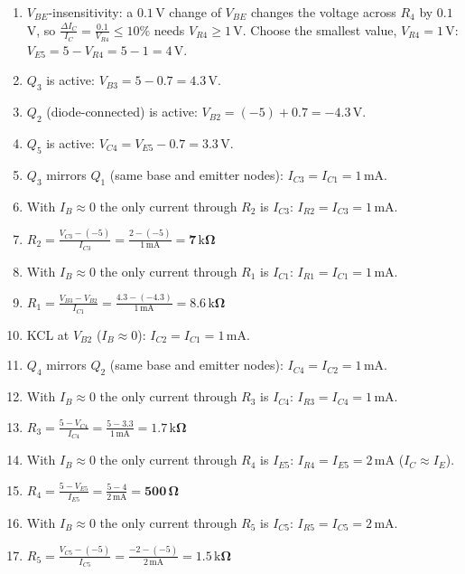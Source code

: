 \documentclass[11pt]{article}
\newcommand{\solstep}[2]{\par\medskip{\color{stepc}\textbf{Step #1 --- #2}}\par\nopagebreak}
\begin{document}
\solstep{2}{Design, node by node}\begin{enumerate}[leftmargin=*,itemsep=3pt]
\item $V_{BE}$-insensitivity: a $0.1$\,V change of $V_{BE}$ changes the voltage across $R_{4}$ by $0.1$\,V, so $\frac{\Delta I_C}{I_C} = \frac{0.1}{V_{R4}} \le 10\%$ needs $V_{R4} \ge 1$\,V. Choose the smallest value, $V_{R4} = 1$\,V: $V_{E5} = 5 - V_{R4} = 5 - 1 = 4\,\mathrm{V}$.
\item $Q_{3}$ is active: $V_{B3} = 5 - 0.7 = 4.3\,\mathrm{V}$.
\item $Q_{2}$ (diode-connected) is active: $V_{B2} = (-5) + 0.7 = -4.3\,\mathrm{V}$.
\item $Q_{5}$ is active: $V_{C4} = V_{E5} - 0.7 = 3.3\,\mathrm{V}$.
\item $Q_{3}$ mirrors $Q_{1}$ (same base and emitter nodes): $I_{C3} = I_{C1} = 1\,\mathrm{m}\mathrm{A}$.
\item With $I_B\approx0$ the only current through $R_{2}$ is $I_{C3}$: $I_{R2} = I_{C3} = 1\,\mathrm{m}\mathrm{A}$.
\item $\displaystyle R_{2} = \frac{V_{C3} - (-5)}{I_{C3}} = \frac{2 - (-5)}{1\,\mathrm{m}\mathrm{A}} = \mathbf{7\,\mathrm{k}\Omega}$
\item With $I_B\approx0$ the only current through $R_{1}$ is $I_{C1}$: $I_{R1} = I_{C1} = 1\,\mathrm{m}\mathrm{A}$.
\item $\displaystyle R_{1} = \frac{V_{B3} - V_{B2}}{I_{C1}} = \frac{4.3 - (-4.3)}{1\,\mathrm{m}\mathrm{A}} = \mathbf{8.6\,\mathrm{k}\Omega}$
\item KCL at $V_{B2}$ ($I_B\approx0$): $I_{C2} = I_{C1} = 1\,\mathrm{m}\mathrm{A}$.
\item $Q_{4}$ mirrors $Q_{2}$ (same base and emitter nodes): $I_{C4} = I_{C2} = 1\,\mathrm{m}\mathrm{A}$.
\item With $I_B\approx0$ the only current through $R_{3}$ is $I_{C4}$: $I_{R3} = I_{C4} = 1\,\mathrm{m}\mathrm{A}$.
\item $\displaystyle R_{3} = \frac{5 - V_{C4}}{I_{C4}} = \frac{5 - 3.3}{1\,\mathrm{m}\mathrm{A}} = \mathbf{1.7\,\mathrm{k}\Omega}$
\item With $I_B\approx0$ the only current through $R_{4}$ is $I_{E5}$: $I_{R4} = I_{E5} = 2\,\mathrm{m}\mathrm{A}$ ($I_C\approx I_E$).
\item $\displaystyle R_{4} = \frac{5 - V_{E5}}{I_{E5}} = \frac{5 - 4}{2\,\mathrm{m}\mathrm{A}} = \mathbf{500\,\Omega}$
\item With $I_B\approx0$ the only current through $R_{5}$ is $I_{C5}$: $I_{R5} = I_{C5} = 2\,\mathrm{m}\mathrm{A}$.
\item $\displaystyle R_{5} = \frac{V_{C5} - (-5)}{I_{C5}} = \frac{-2 - (-5)}{2\,\mathrm{m}\mathrm{A}} = \mathbf{1.5\,\mathrm{k}\Omega}$
\end{enumerate}
\end{document}
